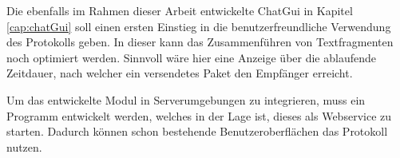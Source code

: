 Die ebenfalls im Rahmen dieser Arbeit entwickelte ChatGui in Kapitel
\ref{cap:chatGui} soll einen ersten Einstieg in die benutzerfreundliche
Verwendung des Protokolls geben. In dieser kann das Zusammenführen von
Textfragmenten noch optimiert werden. Sinnvoll wäre hier eine Anzeige über die
ablaufende Zeitdauer, nach welcher ein versendetes Paket den Empfänger erreicht.

Um das entwickelte Modul in Serverumgebungen zu integrieren, muss ein Programm
entwickelt werden, welches in der Lage ist, dieses als Webservice zu starten.
Dadurch können schon bestehende Benutzeroberflächen das Protokoll nutzen.

